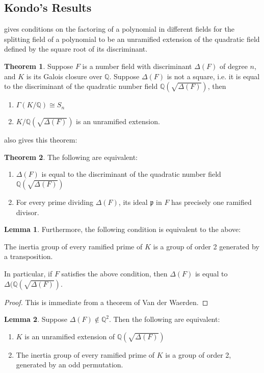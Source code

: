 \documentclass[12pt]{extarticle}
\newcommand{\Q}{\mathbb{Q}}
\newcommand{\<}{\langle}
\renewcommand{\>}{\rangle}
\theoremstyle{definition}
\newtheorem{theorem}{Theorem}
\newtheorem{lemma}{Lemma}
\begin{document}
\subsection{Kondo's Results}
\cite{KOND} gives conditions on the factoring of a polynomial in different fields for the splitting field of a polynomial to be an unramified extension of the quadratic field defined by the square root of its discriminant.
\begin{theorem}
    Suppose $F$ is a number field with discriminant $\Delta(F)$ of degree $n$, and $K$ is its Galois closure over $\Q$. Suppose $\Delta(F)$ is not a square, i.e. it is equal to the discriminant of the quadratic number field $\Q(\sqrt{\Delta(F)})$, then \begin{enumerate}
        \item $\Gamma(K/\Q)\cong S_n$
        \item $K/\Q(\sqrt{\Delta(F)})$ is an unramified extension.
    \end{enumerate}
\end{theorem}
\cite{KOND} also gives this theorem: \begin{theorem}
    The following are equivalent: \begin{enumerate}
        \item $\Delta(F)$ is equal to the discriminant of the quadratic number field $\Q(\sqrt{\Delta(F)})$
        \item For every prime dividing $\Delta(F)$, its ideal $\mathfrak{p}$ in $F$ has precisely one ramified divisor.
    \end{enumerate}
\end{theorem}
\begin{lemma}
Furthermore, the following condition is equivalent to the above:
\par
    The inertia group of every ramified prime of $K$ is a group of order 2 generated by a transposition.\par
In particular, if $F$ satisfies the above condition, then $\Delta(F)$ is equal to $\Delta(\Q(\sqrt{\Delta(F)})$.
\end{lemma}
\begin{proof}
This is immediate from a theorem of Van der Waerden. 
\end{proof}
\begin{lemma}
Suppose $\Delta(F)\notin \Q^2$. Then the following are equivalent:\begin{enumerate}
    \item $K$ is an unramified extension of $\Q(\sqrt{\Delta(F)})$
    \item The inertia group of every ramified prime of $K$ is a group of order 2, generated by an odd permutation. 
\end{enumerate}
\end{lemma} 
\end{document}
